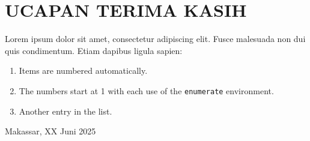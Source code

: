 \begingroup
\chapter*{UCAPAN TERIMA KASIH}
\noindent
\lipsum[1] \par
\lipsum[2] \par
Lorem ipsum dolor sit amet, consectetur adipiscing elit. Fusce
malesuada non dui quis condimentum. Etiam dapibus ligula sapien:
\begin{enumerate}
  \item Items are numbered automatically.
  \item The numbers start at 1 with each use of the
    \texttt{enumerate} environment.
  \item Another entry in the list.\\
\end{enumerate}

\vspace{2cm}

\hfill
\begin{minipage}{0.4\textwidth}
  \raggedleft
  Makassar, XX Juni 2025 \par
  \vspace{2cm}
  \NamaPenulis \\
  \NIM
\end{minipage}
\endgroup
